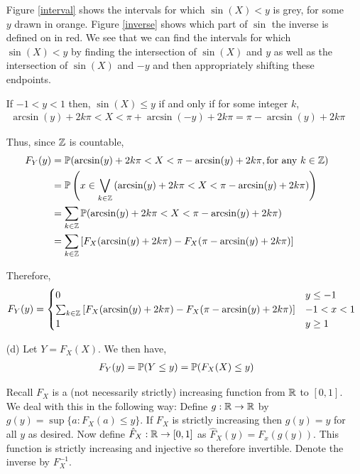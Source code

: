 \documentclass[10pt]{article}
\begin{document}
\begin{solution}[Solution]
\begin{enumerate}
            Figure \ref{interval} shows the intervals for which \( \sin(X)<y \) is grey, for some \( y \) drawn in orange. Figure \ref{inverse} shows which part of \( \sin \) the inverse is defined on in red. We see that we can find the intervals for which \( \sin(X)<y \) by finding the intersection of \( \sin(X) \) and \( y \) as well as the intersection of \( \sin(X) \) and \( -y \) and then appropriately shifting these endpoints.

        If \( -1<y<1 \) then, \( \sin(X)\leq y \) if and only if for some integer \( k \),
        \begin{align*}
            \arcsin(y)+2k\pi<X<\pi+\arcsin(-y)+2k\pi = \pi-\arcsin(y)+2k\pi
        \end{align*}
        
        Thus, since \( \mathbb{Z} \) is countable,
        \begin{align*}
            F_Y(y) &= \mathbb{P}(\arcsin(y)+2k\pi<X<\pi-\arcsin(y)+2k\pi, \text{for any } k\in\mathbb{Z}) \\
                &= \mathbb{P}\left(x\in\bigvee_{k\in\mathbb{Z}}\left( \arcsin(y)+2k\pi<X<\pi-\arcsin(y)+2k\pi \right)\right) \\
                &= \sum_{k\in\mathbb{Z}}\mathbb{P}(\arcsin(y)+2k\pi<X<\pi-\arcsin(y)+2k\pi ) \\
                &= \sum_{k\in\mathbb{Z}}\left[F_X(\arcsin(y)+2k\pi)-F_X(\pi-\arcsin(y)+2k\pi)\right]
        \end{align*}

        Therefore, 
        \begin{align*}
            F_Y(y) = 
            \begin{cases} 
                0 & y\leq -1 \\
                \sum_{k\in\mathbb{Z}}\left[F_X(\arcsin(y)+2k\pi)-F_X(\pi-\arcsin(y)+2k\pi)\right] & -1<x<1 \\
                1 & y\geq 1
            \end{cases}
        \end{align*}

	\item[(d)]
        Let \( Y=F_X(X) \). We then have,
        \begin{align*}
            F_Y(y) = \mathbb{P}(Y\leq y) = \mathbb{P}(F_X(X)\leq y)
        \end{align*}

        Recall \( F_X \) is a (not necessarily strictly) increasing function from \( \mathbb{R} \) to \( [0,1] \). We deal with this in the following way:
        Define \( g:\mathbb{R}\to\mathbb{R} \) by \( g(y) = \sup\{a : F_X(a)\leq y \} \). If \( F_X \) is strictly increasing then \( g(y) = y \) for all \( y \) as desired. Now define \( \hat{F}_X:\mathbb{R}\to[0,1] \) as \( \hat{F}_X(y) = F_x(g(y)) \). This function is strictly increasing and injective so therefore invertible. Denote the inverse by \( F_X^{-1} \).


\end{enumerate}
\end{solution}
\end{document}
